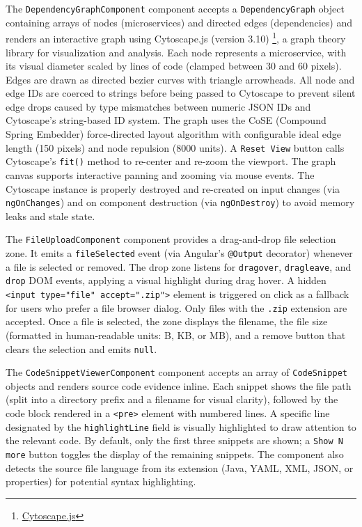 \par The \texttt{DependencyGraphComponent} component accepts a \texttt{DependencyGraph} object containing arrays of nodes (microservices) and directed edges (dependencies) and renders an interactive graph using Cytoscape.js (version 3.10) \footnote{\href{https://cytoscape.org/index.html}{Cytoscape.js}}, a graph theory library for visualization and analysis. Each node represents a microservice, with its visual diameter scaled by lines of code (clamped between 30 and 60 pixels). Edges are drawn as directed bezier curves with triangle arrowheads. All node and edge IDs are coerced to strings before being passed to Cytoscape to prevent silent edge drops caused by type mismatches between numeric JSON IDs and Cytoscape's string-based ID system. The graph uses the CoSE (Compound Spring Embedder) force-directed layout algorithm with configurable ideal edge length (150 pixels) and node repulsion (8000 units). A \texttt{Reset View} button calls Cytoscape's \texttt{fit()} method to re-center and re-zoom the viewport. The graph canvas supports interactive panning and zooming via mouse events. The Cytoscape instance is properly destroyed and re-created on input changes (via \texttt{ngOnChanges}) and on component destruction (via \texttt{ngOnDestroy}) to avoid memory leaks and stale state.

\par The \texttt{FileUploadComponent} component provides a drag-and-drop file selection zone. It emits a \texttt{fileSelected} event (via Angular's \texttt{@Output} decorator) whenever a file is selected or removed. The drop zone listens for \texttt{dragover}, \texttt{dragleave}, and \texttt{drop} DOM events, applying a visual highlight during drag hover. A hidden \texttt{<input type="file" accept=".zip">} element is triggered on click as a fallback for users who prefer a file browser dialog. Only files with the \texttt{.zip} extension are accepted. Once a file is selected, the zone displays the filename, the file size (formatted in human-readable units: B, KB, or MB), and a remove button that clears the selection and emits \texttt{null}.

\par The \texttt{CodeSnippetViewerComponent} component accepts an array of \texttt{CodeSnippet} objects and renders source code evidence inline. Each snippet shows the file path (split into a directory prefix and a filename for visual clarity), followed by the code block rendered in a \texttt{<pre>} element with numbered lines. A specific line designated by the \texttt{highlightLine} field is visually highlighted to draw attention to the relevant code. By default, only the first three snippets are shown; a \texttt{Show N more} button toggles the display of the remaining snippets. The component also detects the source file language from its extension (Java, YAML, XML, JSON, or properties) for potential syntax highlighting.

